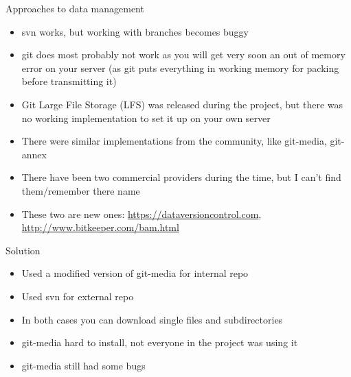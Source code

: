 \documentclass{beamer}
\begin{document}
\begin{frame}{Approaches to data management}

    \begin{itemize}
        \item svn works, but working with branches becomes buggy
        \item git does most probably not work as you will get very soon an out
            of memory error on your server (as git puts everything in working
            memory for packing before transmitting it)
        \item Git Large File Storage (LFS) was released during the project, but
            there was no working implementation to set it up on your own server
        \item There were similar implementations from the community, like
            git-media, git-annex
        \item There have been two commercial providers during the time, but I
            can't find them/remember there name
        \item These two are new ones: \url{https://dataversioncontrol.com},
            \url{http://www.bitkeeper.com/bam.html}
    \end{itemize}

\end{frame}

\begin{frame}{Solution}

    \begin{itemize}
        \item Used a modified version of git-media for internal repo
        \item Used svn for external repo
        \item In both cases you can download single files and subdirectories
        \item git-media hard to install, not everyone in the project was using
            it
        \item git-media still had some bugs
    \end{itemize}

\end{frame}
\end{document}
